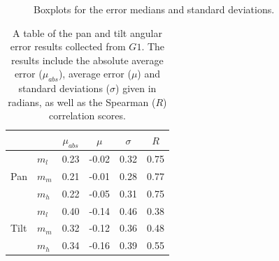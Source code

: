 \documentclass{llncs}
\begin{document}
\begin{figure}
  \centering


  \caption{Boxplots for the error medians and standard deviations. }\label{fig:err-boxplot}
\end{figure}

\begin{table}
  \centering
  \caption{A table of the pan and tilt angular error results collected from $G1$. The results include the absolute average error ($\mu_{abs}$), average error ($\mu$) and standard deviations ($\sigma$) given in radians, as well as the Spearman ($R$) correlation scores.}\label{tab:results}
  \begin{tabular}{llcccc}
    \toprule
    \multicolumn{2}{c}{} & $\mu_{abs}$ & $\mu$ & $\sigma$ & $R$ \\\midrule
	 & $m_l$ & 0.23 & -0.02 & 0.32 & 0.75 \\%
    Pan  & $m_m$ & 0.21 & -0.01 & 0.28 & 0.77 \\%
	 & $m_h$ & 0.22 & -0.05 & 0.31 & 0.75 \\\midrule
	 & $m_l$ & 0.40 & -0.14 & 0.46 & 0.38 \\%
    Tilt & $m_m$ & 0.32 & -0.12 & 0.36 & 0.48 \\%
	 & $m_h$ & 0.34 & -0.16 & 0.39 & 0.55 \\
    \bottomrule
  \end{tabular}
\end{table}
\end{document}

